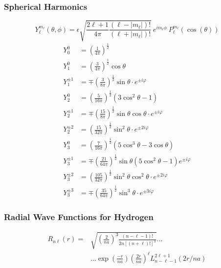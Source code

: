 \subsubsection{Spherical Harmonics}
\noindent\begin{equation*}
    Y_{\ell}^{m_\ell}(\theta, \phi) = \epsilon\sqrt{\frac{2\ell+1}{4\pi}\frac{(\ell-|m_\ell|)!}{(\ell+|m_\ell|)!}}\:e^{im_\ell\phi}\:P_{\ell}^{m_\ell}(\cos(\theta))
\end{equation*}
\noindent\begin{align*}
    Y_0^0      & = {\left(\frac1{4\pi}\right)}^{\frac12}                                                   \\
    Y_1^0      & = {\left(\frac{3}{4\pi}\right)}^{\frac{1}{2}}\cos\theta                                   \\
    Y_1^{\pm1} & = \mp{\left(\frac{3}{8\pi}\right)}^{\frac{1}{2}}\sin\theta\cdot e^{\pm i\varphi}          \\
    Y_2^0      & = {\left(\frac{5}{16\pi}\right)}^{\frac{1}{2}}(3\cos^2\theta-1)                           \\
    Y_2^{\pm1} & = \mp{\left(\frac{15}{8\pi}\right)}^{\frac12}\sin\theta\cos\theta\cdot e^{\pm i\varphi}   \\
    Y_2^{\pm2} & = {\left(\frac{15}{32\pi}\right)}^{\frac12}\sin^2\theta\cdot e^{\pm2i\varphi}             \\
    Y_3^0      & = {(\frac7{16\pi})}^{\frac12}(5\cos^3\theta-3\cos\theta)                                  \\
    Y_3^{\pm1} & = \mp{\left(\frac{21}{64\pi}\right)}^{\frac12}\sin\theta(5\cos^2\theta-1)e^{\pm i\varphi} \\
    Y_3^{\pm2} & = {(\frac{105}{32\pi})}^{\frac12}\sin^2\theta\cos^2\theta\cdot e^{\pm2i\varphi}           \\
    Y_3^{\pm3} & = \mp{\left(\frac{35}{64\pi}\right)}^{\frac12}\sin^3\theta\cdot e^{\pm3i\varphi}
\end{align*}

\subsubsection{Radial Wave Functions for Hydrogen}
\noindent\begin{align*}
    R_{n\ell}(r) = & \sqrt{{\left(\frac{2}{na}\right)}^3\frac{(n-\ell-1)!}{2n{[(n+\ell)!]}^3}} \ldots                    \\
                   & \ldots\exp\left(\frac{-r}{na}\right){\left(\frac{2r}{na}\right)}^\ell L_{n-\ell-1}^{2\ell+1}(2r/na)
\end{align*}


